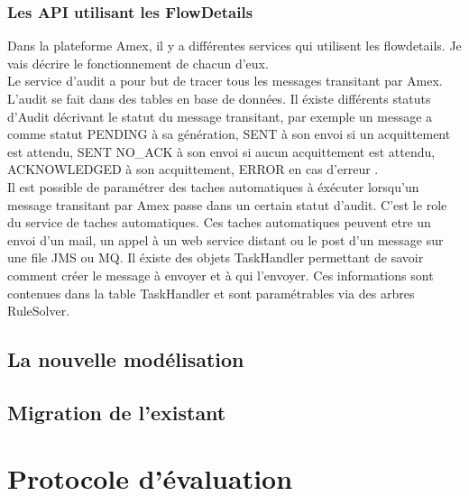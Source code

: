 \subsubsection{Les API utilisant les FlowDetails}
Dans la plateforme Amex, il y a différentes services  qui utilisent les flowdetails. Je vais décrire le fonctionnement de chacun d'eux. \\

Le service d'audit a pour but de tracer tous les messages transitant par Amex. L'audit se fait dans des tables en base de données. Il éxiste différents statuts d'Audit décrivant le statut du message transitant, par exemple un message a comme statut PENDING à sa génération, SENT à son envoi si un acquittement est attendu, SENT NO\_ACK à son envoi si aucun acquittement est attendu, ACKNOWLEDGED à son acquittement, ERROR en cas d'erreur . \\

Il est possible de paramétrer des taches automatiques à éxécuter lorsqu'un message transitant par Amex passe dans un certain statut d'audit. C'est le role du service de taches automatiques. Ces taches automatiques peuvent etre un envoi d'un mail, un appel à un web service distant ou le post d'un message sur une file JMS ou MQ.
Il éxiste des objets TaskHandler permettant de savoir comment créer le message à envoyer et à qui l'envoyer. Ces informations sont contenues dans la table TaskHandler et sont paramétrables via des arbres RuleSolver. 



\subsection{La nouvelle modélisation}

\subsection{Migration de l'existant}

\section{Protocole d'évaluation}

